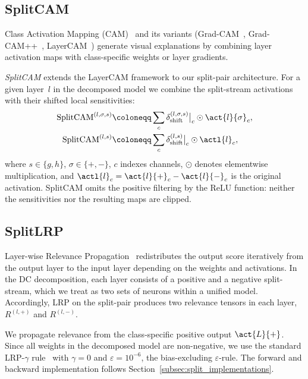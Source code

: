 \subsection{SplitCAM}\label{sec:split_cam}

Class Activation Mapping (CAM)~\parencite{Zhou2016} and its variants (Grad-CAM~\parencite{Selvaraju2017}, Grad-CAM++~\parencite{Chattopadhay2018}, LayerCAM~\parencite{Jiang2021LayerCAM}) generate visual explanations by combining layer activation maps with class-specific weights or layer gradients.

\emph{SplitCAM} extends the LayerCAM framework to our split-pair architecture. For a given layer~$l$ in the decomposed model we combine the split-stream activations with their shifted local sensitivities:
\begin{align}
\text{SplitCAM}^{(l,\sigma,s)} &\coloneqq \sum_c \delta_{\mathrm{shift}}^{(l,\sigma,s)}\big\vert_c\odot\act{l}{\sigma}_c,
\label{eq:splitcam_stream}\\
\text{SplitCAM}^{(l,s)} &\coloneqq \sum_c \delta_{\mathrm{shift}}^{(l,s)}\big\vert_c\odot\actl{l}_c,
\label{eq:splitcam_combined}
\end{align}
where $s\in\{g,h\}$, $\sigma\in\{+,-\}$, $c$ indexes channels, $\odot$ denotes elementwise multiplication, and $\actl{l}_c=\act{l}{+}_c-\act{l}{-}_c$ is the original activation. SplitCAM omits the positive filtering by the ReLU function: neither the sensitivities nor the resulting maps are clipped.

\subsection{SplitLRP}\label{sec:split_lrp}

Layer-wise Relevance Propagation~\parencite{Bach2015} redistributes the output score iteratively from the output layer to the input layer depending on the weights and activations. In the DC decomposition, each layer consists of a positive and a negative split-stream, which we treat as two sets of neurons within a unified model. Accordingly, LRP on the split-pair produces two relevance tensors in each layer, $R^{(l,+)}$ and $R^{(l,-)}$.

We propagate relevance from the class-specific positive output $\act{L}{+}$. Since all weights in the decomposed model are non-negative, we use the standard LRP-$\gamma$ rule~\parencite{Montavon_2022_gammaLRP} with $\gamma=0$ and $\varepsilon=10^{-6}$, the bias-excluding $\varepsilon$-rule. The forward and backward implementation follows Section~\ref{subsec:split_implementations}.

